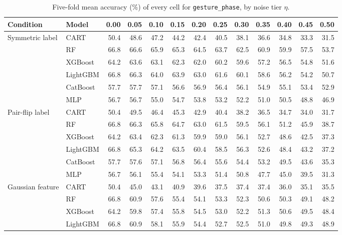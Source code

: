 \begin{table}[p]
\centering
\tiny
\setlength{\tabcolsep}{2.6pt}
\caption{Five-fold mean accuracy (\%) of every cell for \texttt{gesture\_phase}, by noise tier $\eta$.}
\label{tab:grid_gesture_phase}
\begin{tabular}{@{}llrrrrrrrrrrr@{}}
\toprule
Condition & Model & 0.00 & 0.05 & 0.10 & 0.15 & 0.20 & 0.25 & 0.30 & 0.35 & 0.40 & 0.45 & 0.50 \\
\midrule
Symmetric label & CART & 50.4 & 48.6 & 47.2 & 44.2 & 42.4 & 40.5 & 38.1 & 36.6 & 34.8 & 33.3 & 31.5 \\
 & RF & 66.8 & 66.6 & 65.9 & 65.3 & 64.5 & 63.7 & 62.5 & 60.9 & 59.9 & 57.5 & 53.7 \\
 & XGBoost & 64.2 & 63.6 & 63.1 & 62.3 & 62.0 & 60.2 & 59.6 & 57.2 & 56.5 & 54.8 & 51.6 \\
 & LightGBM & 66.8 & 66.3 & 64.0 & 63.9 & 63.0 & 61.6 & 60.1 & 58.6 & 56.2 & 54.2 & 50.7 \\
 & CatBoost & 57.7 & 57.7 & 57.1 & 56.6 & 56.9 & 56.4 & 56.1 & 54.9 & 55.1 & 53.4 & 52.9 \\
 & MLP & 56.7 & 56.7 & 55.0 & 54.7 & 53.8 & 53.2 & 52.2 & 51.0 & 50.5 & 48.8 & 46.9 \\
\midrule
Pair-flip label & CART & 50.4 & 49.5 & 46.4 & 45.3 & 42.9 & 40.4 & 38.2 & 36.5 & 34.7 & 34.0 & 31.7 \\
 & RF & 66.8 & 66.3 & 65.8 & 64.7 & 63.0 & 61.5 & 59.5 & 56.1 & 51.2 & 45.9 & 38.7 \\
 & XGBoost & 64.2 & 63.4 & 62.3 & 61.3 & 59.9 & 59.0 & 56.1 & 52.7 & 48.6 & 42.5 & 37.3 \\
 & LightGBM & 66.8 & 65.3 & 64.2 & 63.5 & 60.4 & 58.5 & 56.3 & 52.6 & 48.4 & 43.2 & 37.2 \\
 & CatBoost & 57.7 & 57.6 & 57.1 & 56.8 & 56.4 & 55.6 & 54.4 & 53.2 & 49.5 & 43.6 & 35.3 \\
 & MLP & 56.7 & 56.1 & 55.4 & 54.1 & 53.3 & 51.4 & 50.8 & 47.7 & 45.0 & 39.5 & 31.3 \\
\midrule
Gaussian feature & CART & 50.4 & 45.0 & 43.1 & 40.9 & 39.6 & 37.5 & 37.4 & 37.4 & 36.0 & 35.1 & 35.5 \\
 & RF & 66.8 & 60.9 & 57.6 & 55.4 & 54.1 & 53.3 & 52.3 & 50.6 & 50.3 & 49.1 & 48.2 \\
 & XGBoost & 64.2 & 59.8 & 57.4 & 55.8 & 54.5 & 53.0 & 52.2 & 51.3 & 50.6 & 49.5 & 48.4 \\
 & LightGBM & 66.8 & 60.9 & 58.1 & 55.9 & 54.4 & 52.7 & 52.5 & 51.0 & 49.8 & 49.3 & 48.9 \\

\end{tabular}
\end{table}
